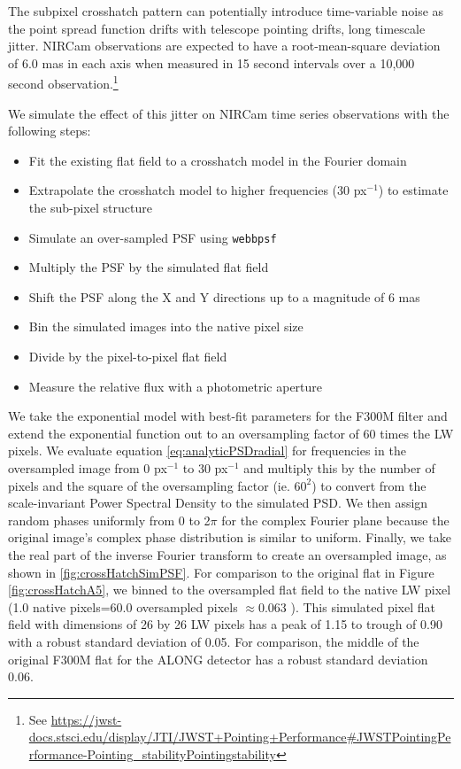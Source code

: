 \documentclass{aastex62}
\begin{document}
The subpixel crosshatch pattern can potentially introduce time-variable noise as the point spread function drifts with telescope pointing drifts, long timescale jitter.
NIRCam observations are expected to have a root-mean-square deviation of 6.0 mas in each axis when measured in 15 second intervals over a 10,000 second observation.\footnote{See \url{https://jwst-docs.stsci.edu/display/JTI/JWST+Pointing+Performance\#JWSTPointingPerformance-Pointing\_stabilityPointingstability}}

We simulate the effect of this jitter on NIRCam time series observations with the following steps:
\begin{itemize}
	\item Fit the existing flat field to a crosshatch model in the Fourier domain
	\item Extrapolate the crosshatch model to higher frequencies (30 px$^{-1}$) to estimate the sub-pixel structure
	\item Simulate an over-sampled PSF using \texttt{webbpsf} \citep{perrin2014webbpsf}
	\item Multiply the PSF by the simulated flat field
	\item Shift the PSF along the X and Y directions up to a magnitude of 6 mas
	\item Bin the simulated images into the native pixel size
	\item Divide by the pixel-to-pixel flat field
	\item Measure the relative flux with a photometric aperture
\end{itemize}



We take the exponential model with best-fit parameters for the F300M filter and extend the exponential function out to an oversampling factor of 60 times the LW pixels.
We evaluate equation \ref{eq:analyticPSDradial} for frequencies in the oversampled image from 0 px$^{-1}$ to 30 px$^{-1}$ and multiply this by the number of pixels and the square of the oversampling factor (ie. $60^2$) to convert from the scale-invariant Power Spectral Density to the simulated PSD.
We then assign random phases uniformly from 0 to 2$\pi$ for the complex Fourier plane because the original image's complex phase distribution is similar to uniform.
Finally, we take the real part of the inverse Fourier transform to create an oversampled image, as shown in \ref{fig:crossHatchSimPSF}.
For comparison to the original flat in Figure \ref{fig:crossHatchA5}, we binned to the oversampled flat field to the native LW pixel (1.0 native pixels=60.0 oversampled pixels $\approx$0.063 \arcsec).
This simulated pixel flat field with dimensions of 26 by 26 LW pixels has a peak of 1.15 to trough of 0.90 with a robust standard deviation of 0.05.
For comparison, the middle of the original F300M flat for the ALONG detector has a robust standard deviation 0.06.
\end{document}
